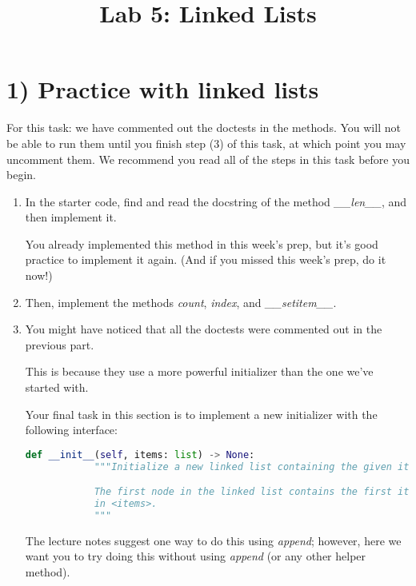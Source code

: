 \documentclass[12pt]{article}
\begin{document}
\title{Lab 5: Linked Lists}
\date{}
\maketitle

\section*{1) Practice with linked lists}

For this task: we have commented out the doctests in the methods. You will not
be able to run them until you finish step (3) of this task, at which point you
may uncomment them. We recommend you read all of the steps in this task before
you begin.

\bigskip

\begin{enumerate}[1.]
    \item In the starter code, find and read the docstring of the method \textit{\_\_len\_\_},
    and then implement it.

    \bigskip

    You already implemented this method in this week’s prep, but it’s good practice
    to implement it again. (And if you missed this week’s prep, do it now!)

    \item Then, implement the methods \textit{count}, \textit{index}, and \textit{\_\_setitem\_\_}.

    \item You might have noticed that all the doctests were commented out in the previous part.

    This is because they use a more powerful initializer than the one we’ve started with.

    \bigskip

    Your final task in this section is to implement a new initializer with the following interface:

    \bigskip

    \begin{lstlisting}[language=python]
        def __init__(self, items: list) -> None:
            """Initialize a new linked list containing the given items.

            The first node in the linked list contains the first item
            in <items>.
            """
    \end{lstlisting}

    \bigskip

    The lecture notes suggest one way to do this using \textit{append}; however,
    here we want you to try doing this without using \textit{append} (or any other helper
    method).


\end{enumerate}
\end{document}
